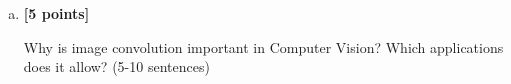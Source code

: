 \begin{enumerate}[(a)]




    
\item \textbf{[5 points]} 
\begin{tcolorbox}[colback=orange!5!white,colframe=orange!75!black]
Why is image convolution important in Computer Vision? Which applications does it allow? (5-10 sentences)
\end{tcolorbox}
\end{enumerate}



